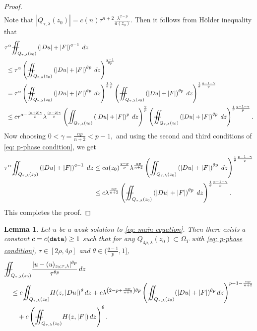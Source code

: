 \documentclass[11pt,oneside, english,reqno,twoside a4paper]{amsart}
\newtheorem{lemma}{Lemma}[section]
\theoremstyle{definition}
\numberwithin{theorem}{section}
\numberwithin{equation}{section}
\newcommand{\iints}[1]{{\int\hspace{-0.28cm}\int_{#1}}}
\newcommand{\iintss}{{\int\hspace{-0.28cm}\int}}
\newcommand{ \miints }{{\iintss\hspace{-0.56cm} -\hspace{-0.15cm}-}}
\newcommand{\miint}[1]{{\miints_{\hspace{-0.13cm}#1}}}
\begin{document}
\begin{proof}
\begin{align*}
    \end{align*}
Note that $|Q_{\tau, \lambda}(z_0)|=c(n)\tau^{n+2}\frac{\lambda^{2-p}}{a(z_0)}$. Then it follows from H\"{o}lder inequality that
\begin{align*}
&\tau^\alpha \miint{Q_{\tau,\lambda}(z_0)}\left(|Du|+|F|\right)^{q-1}\; dz\\
&\; \leq \tau^\alpha\left(\miint{Q_{\tau,\lambda}(z_0)} \left(|Du|+|F|\right)^{\theta p}\; dz\right)^{\frac{q-1}{\theta p}}\\
&\;= \tau^\alpha\left(\miint{Q_{\tau,\lambda}(z_0)} \left(|Du|+|F|\right)^{\theta p}\; dz\right)^{\frac{1}{\theta}\frac{\gamma}{p}}\left(\miint{Q_{\tau,\lambda}(z_0)} \left(|Du|+|F|\right)^{\theta p}\; dz\right)^{\frac{1}{\theta}\frac{q-1-\gamma}{p}}\\
&\; \leq c\tau^{\alpha-\frac{(n+2)\gamma}{p}}\lambda^{\frac{(p-2)\gamma}{p}}\left(\iints{Q_{\tau,\lambda}(z_0)} \left(|Du|+|F|\right)^{p}\; dz\right)^{\frac{\gamma}{p}}\left(\miint{Q_{\tau,\lambda}(z_0)} \left(|Du|+|F|\right)^{\theta p}\; dz\right)^{\frac{1}{\theta}\frac{q-1-\gamma}{p}}.
\end{align*}
Now choosing $0<\gamma=\frac{\alpha p}{n+2}<p-1,$ and using the second and third conditions of \eqref{eq: p-phase condition}, we get
\begin{align*}
\tau^\alpha \miint{Q_{\tau,\lambda}(z_0)}\left(|Du|+|F|\right)^{q-1}\; dz & \leq c a(z_0)^{\frac{q-p}{p}} \lambda^{\frac{\alpha p}{n+2}}\left(\miint{Q_{\tau,\lambda}(z_0)} \left(|Du|+|F|\right)^{\theta p}\; dz\right)^{\frac{1}{\theta}\frac{p-1-\gamma}{p}} \\
& \leq c\lambda^{\frac{\alpha p}{n+2}}\left(\miint{Q_{\tau,\lambda}(z_0)} \left(|Du|+|F|\right)^{\theta p}\; dz\right)^{\frac{1}{\theta}\frac{p-1-\gamma}{p}}.
\end{align*}
This completes the proof.
\end{proof}

\begin{lemma} \label{lem:p-term of parabolic poincare inequality on p-intrinsic cylinders}
Let $u$ be a weak solution to \eqref{eq: main equation}. Then there exists a constant $c=c(\textnormal{\texttt{data}}) \geq 1$ such that for any $Q_{4\rho,\lambda}(z_0)\subset \Omega_T$ with \eqref{eq: p-phase condition}, $\tau \in [2\rho,4\rho]$ and $\theta \in (\frac{q-1}{p},1]$, 
\begin{align*}
& \miint{Q_{\tau,\lambda}(z_0)}\frac{|u-(u)_{z_0;\tau,\lambda}|^{\theta p}}{\tau^{\theta p}}\, dz \\
& \quad \leq c \miint{Q_{\tau,\lambda}(z_0)}H(z,|Du|)^{\theta}\, dz+c \lambda^{\left(2-p+\frac{\alpha p}{n+2}\right)\theta p} \left(\miint{Q_{\tau,\lambda}(z_0)} (|Du|+|F|)^{\theta p}\, dz\right)^{p-1-\frac{\alpha p}{n+2}} \\
&\qquad +c\left(\miint{Q_{\tau,\lambda}(z_0)}H(z,|F|) \, d z\right)^{\theta}.
\end{align*}
\end{lemma}
\end{document}
